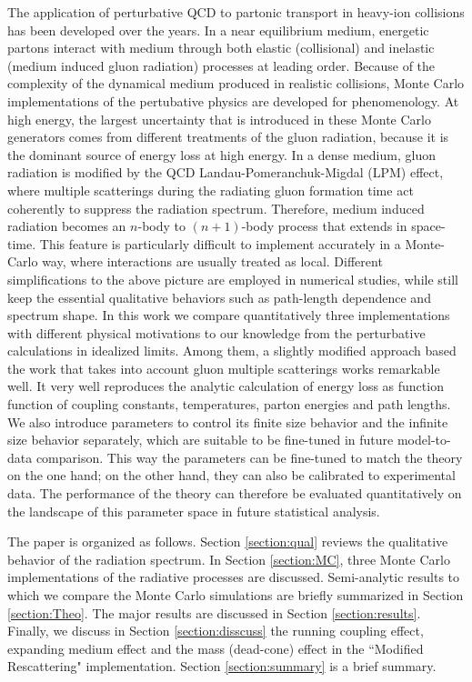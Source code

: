 \documentclass[aps, prc, reprint, amsmath, groupedaddress, nofootinbib]{revtex4-1}
\begin{document}
The application of perturbative QCD to partonic transport in heavy-ion collisions has been developed over the years.
In a near equilibrium medium, energetic partons interact with medium through both elastic (collisional) and inelastic (medium induced gluon radiation) processes at leading order.
Because of the complexity of the dynamical medium produced in realistic collisions, Monte Carlo implementations of the pertubative physics are developed for phenomenology.
At high energy, the largest uncertainty that is introduced in these Monte Carlo generators comes from different treatments of the gluon radiation, because it is the dominant source of energy loss at high energy.
In a dense medium, gluon radiation is modified by the QCD Landau-Pomeranchuk-Migdal (LPM) effect, where multiple scatterings during the radiating gluon formation time act coherently to suppress the radiation spectrum.
Therefore, medium induced radiation becomes an $n$-body to $(n+1)$-body process that extends in space-time.
This feature is particularly difficult to implement accurately in a Monte-Carlo way, where interactions are usually treated as local.
Different simplifications to the above picture are employed in numerical studies, while still keep the essential qualitative behaviors such as path-length dependence and spectrum shape.
In this work we compare quantitatively three implementations with different physical motivations to our knowledge from the perturbative calculations in idealized limits.
Among them, a slightly modified approach based the work that takes into account gluon multiple scatterings works remarkable well.
It very well reproduces the analytic calculation of energy loss as function function of coupling constants, temperatures, parton energies and path lengths.
We also introduce parameters to control its finite size behavior and the infinite size behavior separately, which are suitable to be fine-tuned in future model-to-data comparison.
This way the parameters can be fine-tuned to match the theory on the one hand; on the other hand, they can also be calibrated to experimental data.
The performance of the theory can therefore be evaluated quantitatively on the landscape of this parameter space in future statistical analysis.

The paper is organized as follows. Section \ref{section:qual} reviews the qualitative behavior of the radiation spectrum.
In Section \ref{section:MC}, three Monte Carlo implementations of the radiative processes are discussed. 
Semi-analytic results to which we compare the Monte Carlo simulations are briefly summarized in Section \ref{section:Theo}.
The major results are discussed in Section \ref{section:results}.
Finally, we discuss in Section \ref{section:disscuss} the running coupling effect, expanding medium effect and the mass (dead-cone) effect in the ``Modified Rescattering" implementation. Section \ref{section:summary} is a brief summary.
\end{document}
